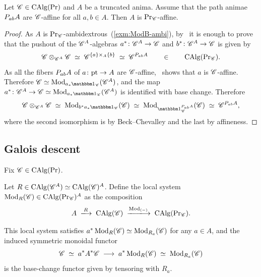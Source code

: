 \documentclass[english,svgnames,table]{article}
\begin{document}
    \begin{proposition}
    \label{prop:affineness-and-categorification}
        Let $\mathscr{C} \in \operatorname{CAlg}(\operatorname{Pr})$ and $A$ be a truncated anima. Assume that the path animae $P_{ab} A$ are $\mathscr{C}$-affine for all $a,b \in A$. Then $A$ is $\operatorname{Pr}_{\mathscr{C}}$-affine.
    \end{proposition}
    \begin{proof}
        As $A$ is $\operatorname{Pr}_{\mathscr{C}}$-ambidextrous~(\cref{exm:ModB-ambi}), by~\cite[Theorem~2.38(3)]{BCSY-Fourier} it is enough to prove that the pushout of the $\mathscr{C}^A$-algebras $a^* \colon \mathscr{C}^A \to \mathscr{C}$ and $b^* \colon \mathscr{C}^A \to \mathscr{C}$ is given by
        \begin{equation*}
            \mathscr{C} \otimes_{\mathscr{C}^A} \mathscr{C} \;\simeq\; \mathscr{C}^{\{a\}\times_A\{b\}} \;\simeq\; \mathscr{C}^{P_{ab} A} \qquad \in \qquad \operatorname{CAlg}(\operatorname{Pr}_{\mathscr{C}}).
        \end{equation*}
        As all the fibers $P_{ab} A$ of $a \colon \mathrm{pt} \to A$ are $\mathscr{C}$-affine,~\cite[Proposition~2.18(3)]{BCSY-Fourier} shows that $a$ is $\mathscr{C}$-affine.
        Therefore $\cC \simeq \Mod_{a_* \ounit_{\cC}} (\cC^A)$, and the map $a^* \colon \cC^A \to \cC \simeq \Mod_{a_* \ounit_{\cC}}(\cC^A)$ is identified with base change. Therefore
        \begin{equation*}
            \cC \otimes_{\cC^A} \cC \;\simeq\; \Mod_{b^* a_* \ounit_{\cC}} (\cC) \;\simeq\; \Mod_{\ounit_{\cC}^{\Path_{ab} A}}(\cC) \;\simeq\; \cC^{\Path_{ab} A},
        \end{equation*}
        where the second isomorphism is by Beck--Chevalley and the last by affineness.
    \end{proof}


\subsection{Galois descent}
\label{subsec:Galois-descent}
    Fix $\mathscr{C} \in \operatorname{CAlg}(\operatorname{Pr})$. 
    \begin{definition}
        Let $R \in \operatorname{CAlg}(\mathscr{C}^A) \simeq \operatorname{CAlg}(\mathscr{C})^A$. Define the local system $\operatorname{Mod}_R(\mathscr{C}) \in \operatorname{CAlg}(\operatorname{Pr}_{\mathscr{C}})^A$ as the composition
        \begin{equation*}
            A \;\xtoo{R}\; \CAlg(\cC) \;\xtoo{\Mod_{(-)}}\; \CAlgC.
        \end{equation*}
    \end{definition}
    \begin{remark}
        This local system satisfies $a^* \operatorname{Mod}_R(\mathscr{C}) \simeq \operatorname{Mod}_{R_a}(\mathscr{C})$ for any $a \in A$, and the induced symmetric monoidal functor
        \begin{equation*}
            \mathscr{C} \;\simeq\; a^* A^* \mathscr{C} \;\longrightarrow\; a^* \operatorname{Mod}_R(\mathscr{C}) \;\simeq\; \operatorname{Mod}_{R_a}(\mathscr{C})
        \end{equation*}
        is the base-change functor given by tensoring with $R_a$.
    \end{remark}
 
\end{document}
